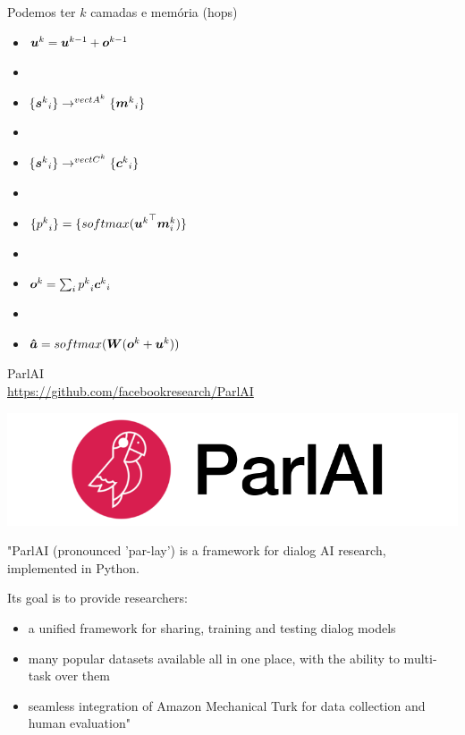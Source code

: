 \documentclass[10pt]{beamer}
\begin{document}
\begin{frame}{ Podemos ter $k$ camadas e memória (hops)}
\begin{itemize}
\item $\bm{u}^{k} = \bm{u}^{k-1} + \bm{o}^{k-1}$
\item[]
\item $\{ {\bm{s}^{k}}_i\} \rightarrow^{{vect{A}^{k}}} \{ {\bm{m}^{k}}_i\}$
\item[]
\item $\{ {\bm{s}^{k}}_i\} \rightarrow^{{vect{C}^{k}}} \{ {\bm{c}^{k}}_i\}$
\item[]
\item $\{{p^{k}}_i\} = \{ softmax({\bm{u}^{k}}^{\top} {\bm{m}^{k}_{i}})\}$
\item[]
\item $\bm{o}^{k}= \sum_{i} {p^{k}}_i {\bm{c}^{k}}_i$
\item[]
\item $\bm{\hat{a}}= softmax(\bm{W}(\bm{o}^{k} + \bm{u}^{k}))$
\end{itemize}
\end{frame}

\begin{frame}{ParlAI \\ \url{https://github.com/facebookresearch/ParlAI}}

\begin{center}
\includegraphics[scale=0.84]{images/parlai.png}
\end{center}

"ParlAI (pronounced 'par-lay') is a framework for dialog AI research, implemented in Python.

Its goal is to provide researchers:

\begin{itemize}
\item a unified framework for sharing, training and testing dialog models
\item many popular datasets available all in one place, with the ability to multi-task over them
\item seamless integration of Amazon Mechanical Turk for data collection and human evaluation"
\end{itemize}

\end{frame}
\end{document}
